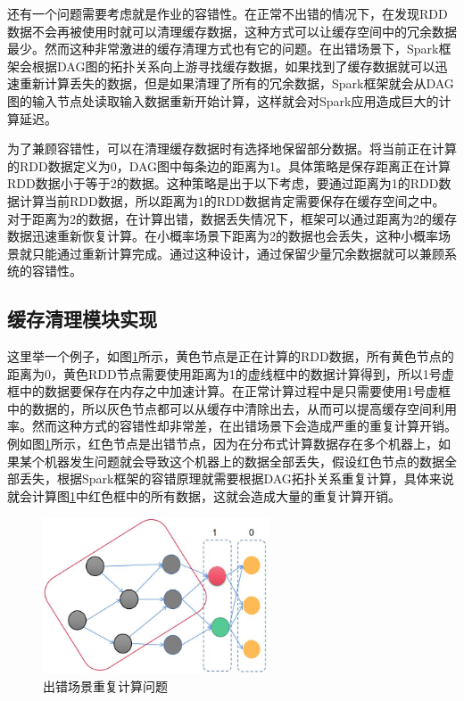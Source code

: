 还有一个问题需要考虑就是作业的容错性。在正常不出错的情况下，在发现RDD数据不会再被使用时就可以清理缓存数据，这种方式可以让缓存空间中的冗余数据最少。然而这种非常激进的缓存清理方式也有它的问题。在出错场景下，Spark框架会根据DAG图的拓扑关系向上游寻找缓存数据，如果找到了缓存数据就可以迅速重新计算丢失的数据，但是如果清理了所有的冗余数据，Spark框架就会从DAG图的输入节点处读取输入数据重新开始计算，这样就会对Spark应用造成巨大的计算延迟。

为了兼顾容错性，可以在清理缓存数据时有选择地保留部分数据。将当前正在计算的RDD数据定义为0，DAG图中每条边的距离为1。具体策略是保存距离正在计算RDD数据小于等于2的数据。这种策略是出于以下考虑，要通过距离为1的RDD数据计算当前RDD数据，所以距离为1的RDD数据肯定需要保存在缓存空间之中。对于距离为2的数据，在计算出错，数据丢失情况下，框架可以通过距离为2的缓存数据迅速重新恢复计算。在小概率场景下距离为2的数据也会丢失，这种小概率场景就只能通过重新计算完成。通过这种设计，通过保留少量冗余数据就可以兼顾系统的容错性。

\subsection{缓存清理模块实现}

这里举一个例子，如图\ref{fig:ft1}所示，黄色节点是正在计算的RDD数据，所有黄色节点的距离为0，黄色RDD节点需要使用距离为1的虚线框中的数据计算得到，所以1号虚框中的数据要保存在内存之中加速计算。在正常计算过程中是只需要使用1号虚框中的数据的，所以灰色节点都可以从缓存中清除出去，从而可以提高缓存空间利用率。然而这种方式的容错性却非常差，在出错场景下会造成严重的重复计算开销。例如图\ref{fig:ft1}所示，红色节点是出错节点，因为在分布式计算数据存在多个机器上，如果某个机器发生问题就会导致这个机器上的数据全部丢失，假设红色节点的数据全部丢失，根据Spark框架的容错原理就需要根据DAG拓扑关系重复计算，具体来说就会计算图\ref{fig:ft1}中红色框中的所有数据，这就会造成大量的重复计算开销。

\begin{figure}[htbp]
    \centering
    \includegraphics[width=0.6\textwidth]{Img/ft1.png}
    \caption{出错场景重复计算问题}
    \label{fig:ft1}
\end{figure}

